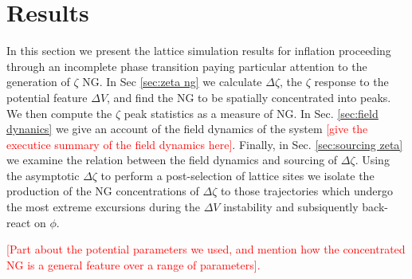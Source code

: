 
\section{Results} \label{sec:results}

In this section we present the lattice simulation results for inflation proceeding through an incomplete phase transition paying particular attention to the generation of $\zeta$ NG. In Sec \ref{sec:zeta ng} we calculate $\Delta\zeta$, the $\zeta$ response to the potential feature $\Delta V$, and find the NG to be spatially concentrated into peaks. We then compute the $\zeta$ peak statistics as a measure of NG. In Sec. \ref{sec:field dynanics} we give an account of the field dynamics of the system \textcolor{red}{[give the executice summary of the field dynamics here]}. Finally, in Sec. \ref{sec:sourcing zeta} we examine the relation between the field dynamics and sourcing of $\Delta\zeta$. Using the asymptotic $\Delta\zeta$ to perform a post-selection of lattice sites we isolate the production of the NG concentrations of $\Delta\zeta$ to those trajectories which undergo the most extreme excursions during the $\Delta V$ instability and subsiquently back-react on $\phi$.

\textcolor{red}{[Part about the potential parameters we used, and mention how the concentrated NG is a general feature over a range of parameters].}




